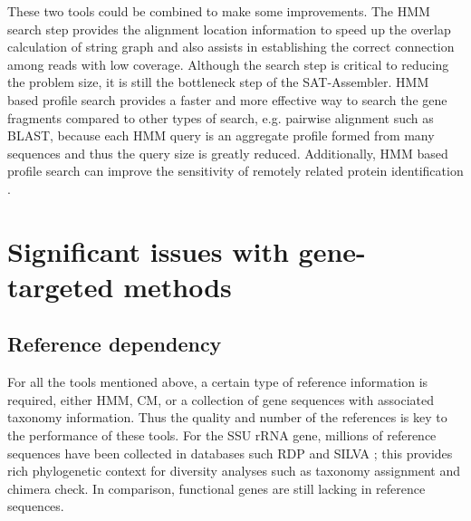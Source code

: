 \documentclass[]{msu-thesis}
\begin{document}
These two tools could be combined to make some improvements.
The HMM search step
provides the alignment location information to speed up the
overlap calculation of string graph and also assists in establishing the
correct connection among reads with low coverage.
Although the search step is critical to reducing
the problem size, it is still the bottleneck step of
the SAT-Assembler. HMM based profile search provides a faster and more
effective way to search the gene fragments compared to other types
of search, e.g. pairwise alignment such as BLAST, because each HMM query
is an aggregate profile formed from many sequences and thus the query size
is greatly reduced. Additionally, HMM based profile search can improve
the sensitivity of remotely related protein identification
\cite{eddy_new_2009}.

\section{Significant issues with gene-targeted methods}

\subsection{Reference dependency}
For all the tools mentioned above, a certain type of reference
information is required, either HMM, CM, or a collection of gene
sequences with associated taxonomy information. Thus the quality and
number of the references is key to the performance of these tools. For
the SSU rRNA gene, millions of reference sequences have been
collected in databases such RDP and SILVA
\cite{cole_ribosomal_2014,quast_silva_2013}; this provides rich
phylogenetic context for diversity analyses such as taxonomy assignment
and chimera check.  In comparison, functional genes are still lacking in
reference sequences.

\end{document}

